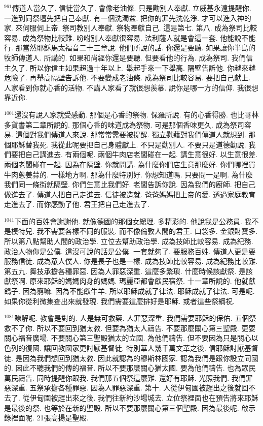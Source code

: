 \documentclass{book}
\begin{document}
$^{961}$傳道人當久了.
信徒當久了.
會像老油條.
只是勸別人奉獻.
立威基永遠提醒你.
一進到同祭壇先把自己奉獻.
有一個洗濁盆.
把你的罪先洗乾淨.
才可以進入神的家.
來伺服伺上帝.
祭司教別人奉獻.
祭物奉獻自己.
這是第七.
第八.
成為祭司比較容易.
成為祭物比較難.
吩咐別人奉獻很容易.
法利薩人就是會這一套.
他能說不能行.
那當然耶穌馬太福音二十三章說.
他們所說的話.
你還是要聽.
如果讓你半島的牧師傳道人.
所講的.
如果和尚經你還是要聽.
但要看他的行為.
成為祭司.
我們信主久了.
所以你信主如果超過十年以上.
舉起手來一下舉高.
隔壁告訴他.
你越來越危險了.
再舉高隔壁告訴他.
不要變成老油條.
成為祭司比較容易.
要把自己獻上.
人家看到你就心香的活物.
不講人家看了就很想羨慕.
說你是哪一方的信仰.
我很想靠近你.

$^{1001}$還沒有說人家就受感動.
那個是心香的祭物.
保羅所說.
有的心香得勝.
也比哥林多貨書第二章所說的.
那個心香的味道成為祭物.
可是那個香味更久.
成為祭司容易.
這個對我們傳道人來說.
那常常需要被提醒.
獨立慰藉對我們傳道人就想到.
那個耶穌替我死.
我從此呢要把自己身體獻上.
不只是勸別人.
不要只是道德勸說.
我們要把自己講進去.
有兩個呢.
兩個牛肉店老闆碰在一起.
講生意很好.
以生意很差.
兩個老闆碰在一起.
因為在隔壁.
你就問講.
為什麼你們店生意那麼好.
你們哪裡買牛肉蔥姜蒜的.
一樣地方啊.
那為什麼特別好.
你想知道嗎.
只要問一是啊.
為什麼我們同一條街就隔壁.
你們生意比我們好.
老闆告訴你說.
因為我們的廚師.
把自己做進去了.
傳道人把自己走進去.
信徒被造就.
爸爸媽媽把上帝的愛.
透過家庭教育走進去了.
而你感動了他.
君王把自己走進去了.

$^{1041}$下面的百姓會謝謝他.
就像德國的那個女總理.
多精彩的.
他說我是公務員.
我不是模特兒.
我不需要各樣不同的服裝.
而不像倫敦人間的君王.
口袋多.
金銀財寶多.
所以第八點幫助人間的政治學.
立位去幫助政治學.
成為技師比較容易.
成為紀務.
政治人物你是公僕.
這沒可說的話是公僕.
一套就夠了.
要服務百姓.
傳道人更是要服務信徒.
成為眾人僕人.
你是長子也是一樣.
成為技師比較容易.
成為紀務比較難.
第五九.
舞技承擔各種罪惡.
因為人罪惡深重.
這麼多繁瑣.
什麼時候該獻祭.
是該獻祭啊.
原來耶穌的媽媽肉身的媽媽.
瑪麗亞都會獻民宿祭.
十一章所說的.
他就獻鴿子.
因為窮嘛.
因為不能獻牛羊.
所以耶穌成就了律法.
耶穌成就了律法.
可是呢.
如果你從利微集查出來就發現.
我們需要這麼排好是耶穌.
或者這些祭綱祝.

$^{1081}$瞭解呢.
教會是對的.
人是無可救藥.
人罪惡深重.
我們需要耶穌的保佑.
五個祭救不了你.
所以不要回到猶太教.
但要為猶太人禱告.
不要那麼關心第三聖殿.
更要關心福音廣場.
不要關心第三聖殿猶太的立國.
為他們禱告.
但不要因為只是關心以色列的復國.
讓回教國家更討厭基督徒.
特別華人幾千萬文革之後.
信耶穌討厭基督徒.
是因為我們想回到猶太教.
因此就認為的穆斯林國家.
認為我們是跟你設立同國的.
因此不聽我們的傳的福音.
所以不要那麼關心猶太國.
要為他們禱告.
也為眾民萬民禱告.
同時提醒你跟我.
我們那五個祭這麼難.
還好有耶穌.
光照我們.
我們罪惡深重.
五祭承擔各種罪惡.
因為人罪惡深重.
第十.
人從伊甸園被趕出之後就回不去了.
從伊甸園被趕出來之後.
我們往新約沙場城去.
立位祭裡面也在預告將來耶穌是最後的祭.
也等於在新的聖殿.
所以不要那麼關心第三個聖殿.
因為最後呢.
啟示錄裡面呢.
21張高揚是聖殿.
\end{document}
